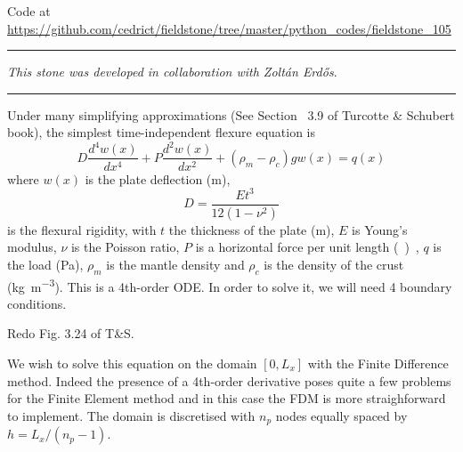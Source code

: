 

\begin{center}
Code at \url{https://github.com/cedrict/fieldstone/tree/master/python_codes/fieldstone_105}
\end{center}

\par\noindent\rule{\textwidth}{0.4pt}

{\sl This stone was developed in collaboration with Zolt{\'a}n Erd{\H{o}}s}. 

\par\noindent\rule{\textwidth}{0.4pt}


Under many simplifying approximations (See Section ~3.9 of Turcotte \& Schubert book), the simplest time-independent flexure equation is
\[
D \frac{d^4w(x)}{dx^4} + P \frac{d^2w(x)}{dx^2} + (\rho_m-\rho_c)g w(x) = q(x)
\]
where $w(x)$ is the plate deflection (\si{m}), 
\[
D=\frac{E t^3}{12(1-\nu^2)}
\]
is the flexural rigidity, with $t$ the thickness of the plate (\si{m}), $E$ is Young's modulus, $\nu$ is the Poisson ratio, $P$ is a horizontal force per unit length (\si{\kg\per\square\metre\square\sec}),  $q$ is the load (\si{\pascal}), $\rho_m$ is the mantle density and $\rho_c$ is the density of the crust (\si{\kg\per\cubic\metre}).
This is a 4th-order ODE. In order to solve it, we will need 4 boundary conditions.

Redo Fig. 3.24 of T\&S. 

We wish to solve this equation on the domain $[0,L_x]$ with the Finite Difference method. Indeed the presence of a 4th-order derivative poses quite a few problems for the Finite Element method and in this case the FDM is more straighforward to implement. The domain is discretised with $n_p$ nodes equally spaced by $h=L_x/(n_p-1)$.

